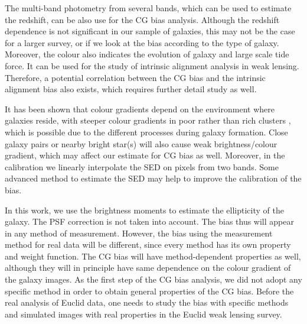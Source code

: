 \documentclass[useAMS,usenatbib]{mn2e}
\begin{document}
The multi-band photometry from several bands, which can be used to
estimate the redshift, can be also use for the CG bias analysis.
Although the redshift dependence is not significant in our sample of
galaxies, this may not be the case for a larger survey, or if we look
at the bias according to the type of galaxy. Moreover, the colour also
indicates the evolution of galaxy and large scale tide force. It can
be used for the study of intrinsic alignment analysis in weak
lensing. Therefore, a potential correlation between the CG bias and
the intrinsic alignment bias also exists, which requires further
detail study as well.


It has been shown that colour gradients depend on the environment
where galaxies reside, with steeper colour gradients in poor rather
than rich clusters \citep[e.g.][]{2005ApJ...626L..19L}, which is
possible due to the different processes during galaxy formation. Close
galaxy pairs or nearby bright star(s) will also cause weak
brightness/colour gradient, which may affect our estimate for CG bias
as well. Moreover, in the calibration we linearly interpolate the SED
on pixels from two bands. Some advanced method to estimate the SED
\citep[e.g.][]{2016A&A...589A...2J} may help to improve the
calibration of the bias.

In this work, we use the brightness moments to estimate the
ellipticity of the galaxy. The PSF correction is not taken into
account. The bias thus will appear in any method of measurement.
However, the bias using the measurement method for real data
will be different, since every method has its own property and weight
function. The CG bias will have method-dependent properties as well,
although they will in principle have same dependence on the colour
gradient of the galaxy images. As the first step of the CG bias
analysis, we did not adopt any specific method in order to obtain
general properties of the CG bias. Before the real analysis of Euclid
data, one needs to study the bias with specific methods and simulated
images with real properties in the Euclid weak lensing survey.

%
\end{document}
